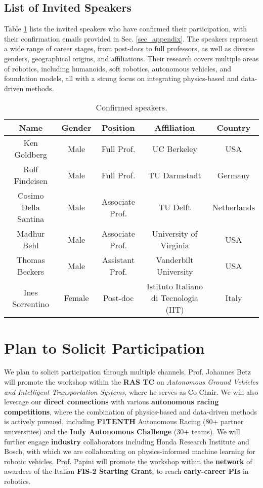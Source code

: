 \documentclass[12pt,a4paper]{article}
\begin{document}
\subsection{List of Invited Speakers} \label{sec_list_of_invited_speakers}
%
Table \ref{tab_speakers} lists the invited speakers who have confirmed their participation, with their confirmation emails provided in Sec. \ref{sec_appendix}. The speakers represent a wide range of career stages, from post-docs to full professors, as well as diverse genders, geographical origins, and affiliations. Their research covers multiple areas of robotics, including humanoids, soft robotics, autonomous vehicles, and foundation models, all with a strong focus on integrating physics-based and data-driven methods.
%
\begin{table}[h!]
	\centering
	\begin{tabular}{c|c|c|c|c}
		\toprule 
    \textbf{Name} & \textbf{Gender} & \textbf{Position} & \textbf{Affiliation} & \textbf{Country}\\
    \hline
		Ken Goldberg & Male & Full Prof. & UC Berkeley & USA\\
		\hline
		Rolf Findeisen & Male & Full Prof. & TU Darmstadt & Germany\\
		\hline
        Cosimo Della Santina & Male & Associate Prof. & TU Delft & Netherlands\\
		\hline
		Madhur Behl & Male & Associate Prof. & University of Virginia & USA\\
		\hline
		Thomas Beckers & Male & Assistant Prof. & Vanderbilt University & USA\\
		\hline
        Ines Sorrentino & Female & Post-doc & Istituto Italiano di Tecnologia (IIT) & Italy\\
		\toprule
	\end{tabular}
	\caption{Confirmed speakers.}
	\label{tab_speakers}
\end{table}
%
\section{Plan to Solicit Participation}
%
We plan to solicit participation through multiple channels. Prof. Johannes Betz will promote the workshop within the \textbf{RAS TC} on \textit{Autonomous Ground Vehicles and Intelligent Transportation Systems}, where he serves as Co-Chair. We will also leverage our \textbf{direct connections} with various \textbf{autonomous racing competitions}, where the combination of physics-based and data-driven methods is actively pursued, including \textbf{F1TENTH} Autonomous Racing (80+ partner universities) and the \textbf{Indy Autonomous Challenge} (30+ teams). We will further engage \textbf{industry} collaborators including Honda Research Institute and Bosch, with which we are collaborating on physics-informed machine learning for robotic vehicles. Prof. Papini will promote the workshop within the \textbf{network} of awardees of the Italian \textbf{FIS-2 Starting Grant}, to reach \textbf{early-career PIs} in robotics.
\end{document}
